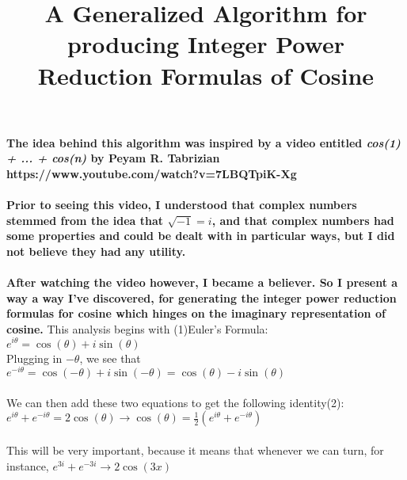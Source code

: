 \documentclass[12pt]{article}
\title{A Generalized Algorithm for producing Integer Power Reduction Formulas
of Cosine}
\begin{document}
\maketitle
\noindent \textbf{The idea behind this algorithm was inspired by a video 
entitled \textit{cos(1) + ... + cos(n)} by Peyam R. Tabrizian}
\\
\textbf{https://www.youtube.com/watch?v=7LBQTpiK-Xg}
\\
\\
\textbf{Prior to seeing this video, I understood that complex numbers stemmed from
the idea that $\sqrt{-1} = i$, and that complex numbers had some properties and
could be dealt with in particular ways, but I did not believe they had any utility.}
\\
\\
\textbf{After watching the video however, I became a believer. So I present a way
a way I've discovered, for generating the integer power reduction formulas for cosine which hinges on the imaginary representation of cosine.}
\newpage
\noindent This analysis begins with (1)Euler's Formula:
$e^{i\theta} = \cos(\theta) + i\sin(\theta)$
\\
Plugging in $-\theta$, we see that 
$e^{-i\theta} = \cos(-\theta) + i\sin(-\theta) = \cos(\theta) - i\sin(\theta)$
\\
\\
We can then add these two equations to get the following identity(2):
\\
$e^{i\theta} + e^{-i\theta} = 2\cos(\theta) \to 
\cos(\theta) = \frac{1}{2}(e^{i\theta} + e^{-i\theta})$
\\
\\
This will be very important, because it means that whenever we can turn, for instance, $e^{3i} + e^{-3i} \to 2\cos(3x)$
\end{document}
